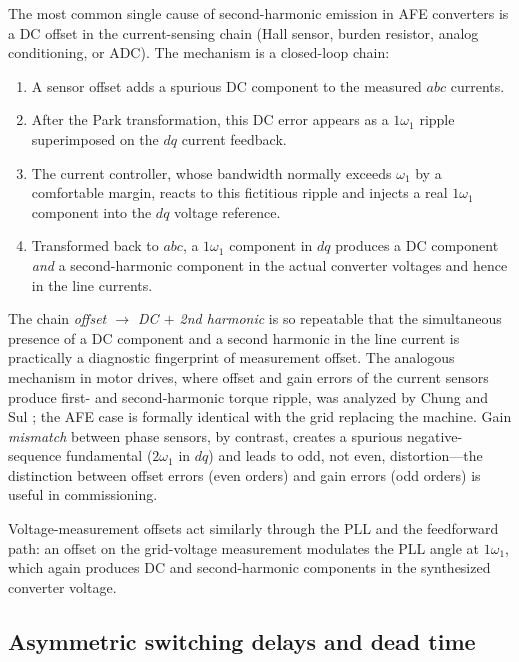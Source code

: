 \documentclass[11pt,a4paper]{article}
\newcommand{\dq}{\ensuremath{dq}}
\begin{document}
The most common single cause of second-harmonic emission in AFE converters is a
DC offset in the current-sensing chain (Hall sensor, burden resistor, analog
conditioning, or ADC). The mechanism is a closed-loop chain:
%
\begin{enumerate}
\item A sensor offset adds a spurious DC component to the measured $abc$
currents.
\item After the Park transformation, this DC error appears as a
$1\omega_1$ ripple superimposed on the $\dq$ current feedback.
\item The current controller, whose bandwidth normally exceeds $\omega_1$ by a
comfortable margin, reacts to this fictitious ripple and injects a real
$1\omega_1$ component into the $\dq$ voltage reference.
\item Transformed back to $abc$, a $1\omega_1$ component in $\dq$ produces a
DC component \emph{and} a second-harmonic component in the actual converter
voltages and hence in the line currents.
\end{enumerate}
%
The chain \emph{offset $\rightarrow$ DC $+$ 2nd harmonic} is so repeatable that
the simultaneous presence of a DC component and a second harmonic in the line
current is practically a diagnostic fingerprint of measurement offset. The
analogous mechanism in motor drives, where offset and gain errors of the current
sensors produce first- and second-harmonic torque ripple, was analyzed by Chung
and Sul \cite{chungsul}; the AFE case is formally identical with the grid
replacing the machine. Gain \emph{mismatch} between phase sensors, by contrast,
creates a spurious negative-sequence fundamental ($2\omega_1$ in $\dq$) and
leads to odd, not even, distortion---the distinction between offset errors
(even orders) and gain errors (odd orders) is useful in commissioning.

Voltage-measurement offsets act similarly through the PLL and the feedforward
path: an offset on the grid-voltage measurement modulates the PLL angle at
$1\omega_1$, which again produces DC and second-harmonic components in the
synthesized converter voltage.

\subsection{Asymmetric switching delays and dead time}
\end{document}
